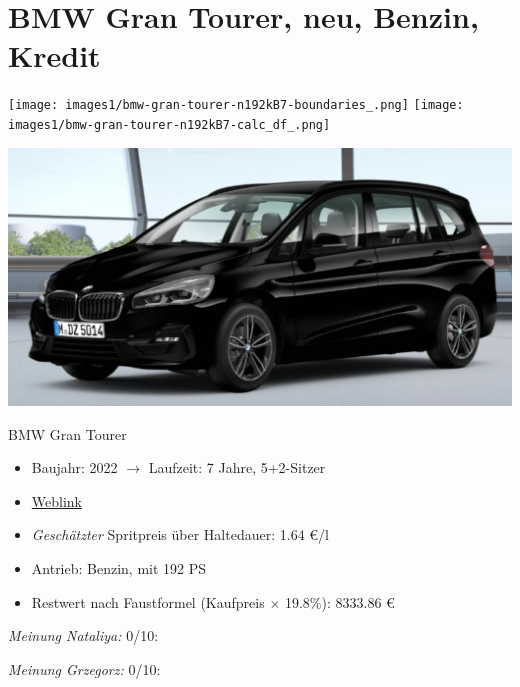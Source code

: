 \documentclass[landscape, DIV=99, 14pt]{scrartcl}
\begin{document}
\pagebreak


\twocolumn

\section*{BMW Gran Tourer, neu, Benzin, Kredit}
\begin{center}
\texttt{[image: images1/bmw-gran-tourer-n192kB7-boundaries\_.png]}
\null
\vspace{0.5cm}
\texttt{[image: images1/bmw-gran-tourer-n192kB7-calc\_df\_.png]}
\end{center}

\pagebreak
\begin{center}
\includegraphics[width=0.9\columnwidth]{cars/bmw-gran-tourer-mulfinger.png}

BMW Gran Tourer
\end{center}

\begin{itemize}
    \item Baujahr: 2022 $\rightarrow$ Laufzeit: 7 Jahre, 5+2-Sitzer
    \item \href{https://mulfinger.de/de/fahrzeugangebot/BMW/220i-GranTourer-Sport-DKG-HUD-LED-ParkAssNavi/page1/details-p5clkem9?manufacturer=5&model=2534&view=list}{Weblink}
    \item \emph{Gesch\"atzter} Spritpreis \"uber Haltedauer: 1.64 \euro{}/l
    \item Antrieb: Benzin, mit 192 PS
    \item Restwert nach Faustformel (Kaufpreis $\times$ 19.8\%): 8333.86 \euro{}
\end{itemize}

\begin{small}
\emph{Meinung Nataliya:} 0/10: 
        
\emph{Meinung Grzegorz:} 0/10: 
\end{small}
\end{document}
